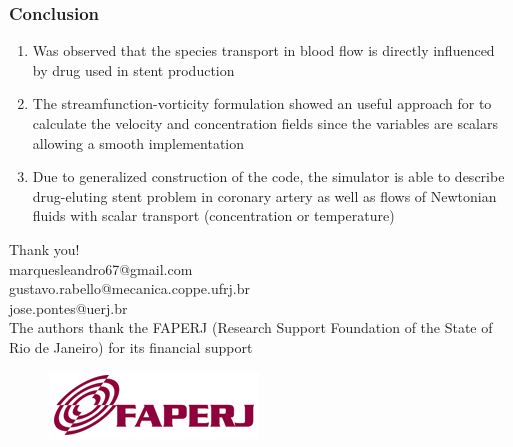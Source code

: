 
\begin{frame}
 \frametitle{\LARGE Conclusion}
 \vspace{-1cm}
\begin{enumerate}
 \justifying
 \small
 \item Was observed that the species transport in blood flow is directly influenced
       by drug used in stent production\\

 \vspace{0.3cm}
 
 \item The streamfunction-vorticity formulation showed an useful approach for to calculate
       the velocity and concentration fields since the variables are scalars allowing a
       smooth implementation\\

 \vspace{0.3cm}

 \item Due to generalized construction of the code, the simulator is able to describe
       drug-eluting stent problem in coronary artery as well as flows of Newtonian fluids
       with scalar transport (concentration or temperature)
\end{enumerate}
\end{frame}



\begin{frame}
 \centering
 \vspace{-1cm}
 \Huge Thank you!\\
 \vspace{0.5cm}
 \small marquesleandro67@gmail.com\\
 \small gustavo.rabello@mecanica.coppe.ufrj.br\\
 \small jose.pontes@uerj.br\\
 \vspace{1.0cm}
 \small The authors thank the FAPERJ (Research Support Foundation of the State of Rio de Janeiro)
        for its financial support

 \vspace{-0.2cm}
 \begin{figure}
  \centering
  \includegraphics[scale=0.4]{images/faperj.jpg}\\
 \end{figure}
\end{frame}





